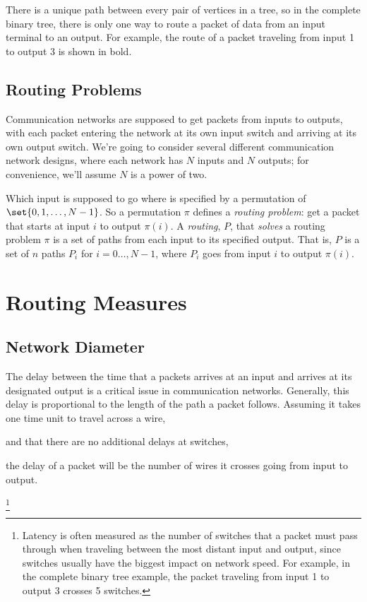 There is a unique path between every pair of vertices in a tree, so in
the complete binary tree, there is only one way to route a packet of
data from an input terminal to an output.  For example, the route of a
packet traveling from input 1 to output 3 is shown in bold.

\subsection{Routing Problems}
Communication networks are supposed to get packets from inputs to outputs,
with each packet entering the network at its own input switch and arriving
at its own output switch.  We're going to consider several different
communication network designs, where each network has $N$ inputs and
$N$ outputs; for convenience, we'll assume $N$ is a power of two.

Which input is supposed to go where is specified by a permutation of
$\set{0, 1, \dots, N - 1}$.  So a permutation $\pi$ defines a 
\emph{routing problem}: get a packet that starts at input $i$ to output
$\pi(i)$.  A \emph{routing},%
%
$P$, that \emph{solves} a routing problem
$\pi$ is a set of paths from each input to its specified output.  That
is, $P$ is a set of $n$ paths $P_i$ for $i=0\dots,N-1$, where $P_i$ goes
from input $i$ to output $\pi(i)$.

\section{Routing Measures}

\subsection{Network Diameter}

The delay between the time that a packets arrives at an input and arrives
at its designated output is a critical issue in communication networks.
Generally, this delay is proportional to the length of the path a packet
follows.  Assuming it takes one time unit to travel across a wire,
\begin{editingnotes}
and that there are no additional delays at switches,
\end{editingnotes}
the delay of a packet will be the number of wires it crosses going from
input to output.

\begin{editingnotes}

\footnote{Latency is often measured as the number of switches that
a packet must pass through when traveling between the most distant input
and output, since switches usually have the biggest impact on network
speed.  For example, in the complete binary tree example, the packet
traveling from input 1 to output 3 crosses 5 switches.}

\end{editingnotes}

